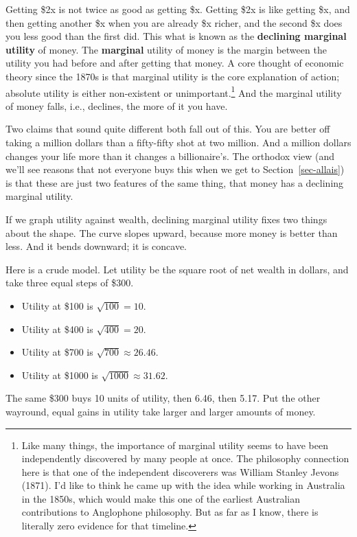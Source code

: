 \documentclass[
  11pt,
  letterpaper,
]{scrbook}
\providecommand{\tightlist}{%
  \setlength{\itemsep}{0pt}\setlength{\parskip}{0pt}}
\begin{document}
Getting \$2x is not twice as good as getting \$x. Getting \$2x is like
getting \$x, and then getting another \$x when you are already \$x
richer, and the second \$x does you less good than the first did. This
what is known as the \textbf{declining marginal utility} of money. The
\textbf{marginal} utility of money is the margin between the utility you
had before and after getting that money. A core thought of economic
theory since the 1870s is that marginal utility is the core explanation
of action; absolute utility is either non-existent or
unimportant.\footnote{Like many things, the importance of marginal
  utility seems to have been independently discovered by many people at
  once. The philosophy connection here is that one of the independent
  discoverers was William Stanley Jevons (1871). I'd like to think he
  came up with the idea while working in Australia in the 1850s, which
  would make this one of the earliest Australian contributions to
  Anglophone philosophy. But as far as I know, there is literally zero
  evidence for that timeline.} And the marginal utility of money falls,
i.e., declines, the more of it you have.

Two claims that sound quite different both fall out of this. You are
better off taking a million dollars than a fifty-fifty shot at two
million. And a million dollars changes your life more than it changes a
billionaire's. The orthodox view (and we'll see reasons that not
everyone buys this when we get to Section~\ref{sec-allais}) is that
these are just two features of the same thing, that money has a
declining marginal utility.

If we graph utility against wealth, declining marginal utility fixes two
things about the shape. The curve slopes upward, because more money is
better than less. And it bends downward; it is concave.

Here is a crude model. Let utility be the square root of net wealth in
dollars, and take three equal steps of \$300.

\begin{itemize}
\tightlist
\item
  Utility at \$100 is \(\sqrt{100} = 10\).
\item
  Utility at \$400 is \(\sqrt{400} = 20\).
\item
  Utility at \$700 is \(\sqrt{700} \approx 26.46\).
\item
  Utility at \$1000 is \(\sqrt{1000} \approx 31.62\).
\end{itemize}

The same \$300 buys 10 units of utility, then 6.46, then 5.17. Put the
other wayround, equal gains in utility take larger and larger amounts of
money.
\end{document}
